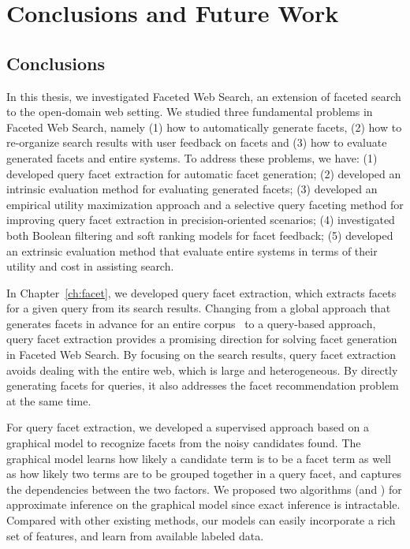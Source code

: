 \chapter{Conclusions and Future Work}
\label{ch:conclusions}
\section{Conclusions}
In this thesis, we investigated Faceted Web Search, an extension of faceted search to the open-domain web setting. We studied three fundamental problems in Faceted Web Search, namely (1) how to automatically generate facets, (2) how to re-organize search results with user feedback on facets and (3) how to evaluate generated facets and entire systems. To address these problems, we have: (1) developed query facet extraction for automatic facet generation; (2) developed an intrinsic evaluation method for evaluating generated facets; (3) developed an empirical utility maximization approach and a selective query faceting method for improving query facet extraction in precision-oriented scenarios; (4) investigated both Boolean filtering and soft ranking models for facet feedback; (5) developed an extrinsic evaluation method that evaluate entire systems in terms of their utility and cost in assisting search.

In Chapter~\ref{ch:facet}, we developed query facet extraction, which extracts facets for a given query from its search results. Changing from a global approach that generates facets in advance for an entire corpus~\cite{stoica2007automating,dakka2008automatic} to a query-based approach, query facet extraction provides a promising direction for solving facet generation in Faceted Web Search.
By focusing on the search results, query facet extraction avoids dealing with the entire web, which is large and heterogeneous. By directly generating facets for queries, it also addresses the facet recommendation problem at the same time.
 
For query facet extraction, we developed a supervised approach based on a graphical model to recognize facets from the noisy candidates found. The graphical model learns how likely a candidate term is to be a facet term as well as how likely two terms are to be grouped together in a query facet, and captures the dependencies between the two factors. We proposed two algorithms (\QFI and \QFJ) for approximate inference on the graphical model since exact inference is intractable. Compared with other existing methods, our models can easily incorporate a rich set of features, and learn from available labeled data.

